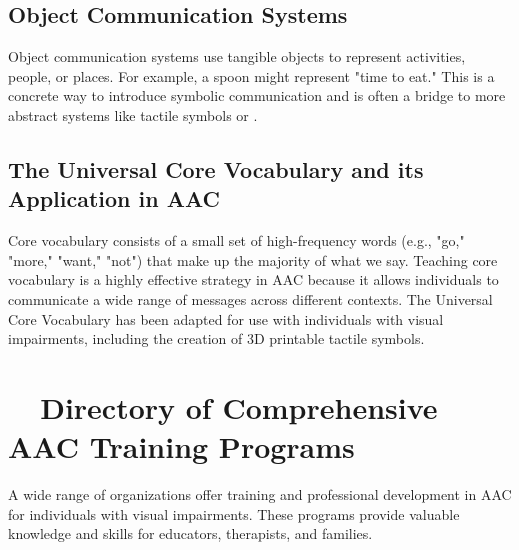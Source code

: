 \subsection{Object Communication Systems}\label{app6:object-comm}
Object communication systems use tangible objects to represent activities, people, or places. For example, a spoon might represent "time to eat." This is a concrete way to introduce symbolic communication and is often a bridge to more abstract systems like tactile symbols or .

\subsection{The Universal Core Vocabulary and its Application in AAC}\label{app6:core-vocab}
Core vocabulary consists of a small set of high-frequency words (e.g., "go," "more," "want," "not") that make up the majority of what we say. Teaching core vocabulary is a highly effective strategy in AAC because it allows individuals to communicate a wide range of messages across different contexts. The Universal Core Vocabulary has been adapted for use with individuals with visual impairments, including the creation of 3D printable tactile symbols.

\section{~~Directory of Comprehensive AAC Training Programs}\label{app6:aac-training}
A wide range of organizations offer training and professional development in AAC for individuals with visual impairments. These programs provide valuable knowledge and skills for educators, therapists, and families.


